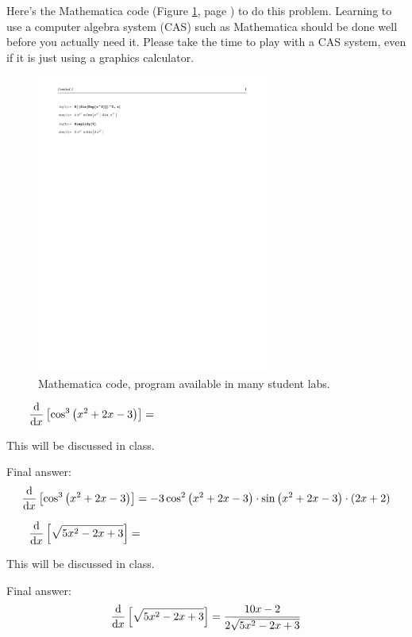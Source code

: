 \documentclass[12pt,addpoints, answers, fleqn]{exam}
\begin{document}
\begin{questions}
\begin{solution}
Here's the Mathematica code (Figure \ref{fig:mathematica15}, page \pageref{fig:mathematica15}) to do this problem. Learning to use a computer algebra system (CAS) such as Mathematica should be done well before you actually need it. Please take the time to play with a CAS system, even if it is just using a graphics calculator.
\end{solution}
\begin{figure}[htbp] %
   \centering
   \includegraphics[width=3in]{./graphics/mathematica15.pdf} 
   \caption{Mathematica code,  program available in many student labs.}
   \label{fig:mathematica15}
\end{figure}


\question $\qquad \displaystyle \frac{{\rm{d}}}{{\rm{d}}x}\left[ \cos^3 \left(x^2 + 2x -3\right) \right] = $
\begin{solution}
This will be discussed in class.

Final answer:
\[
\frac{{\rm{d}}}{{\rm{d}}x}\left[ \cos^3 \left(x^2 + 2x -3\right) \right] =  -3 \cos^2 \left(x^2 + 2x -3\right) \cdot \sin \left(x^2 + 2x -3\right) \cdot  \left(2x + 2\right)
\]
\end{solution}





\question $\qquad \displaystyle \frac{{\rm{d}}}{{\rm{d}}x}\left[ \sqrt{5x^2 - 2x + 3} \right] = $
\begin{solution}
This will be discussed in class.

Final answer:
\[
\frac{{\rm{d}}}{{\rm{d}}x}\left[ \sqrt{5x^2 - 2x + 3} \right] =  \frac{10x - 2}{2 \sqrt{5x^2 - 2x + 3}}
\]

\end{solution}

\end{questions}
\end{document}
